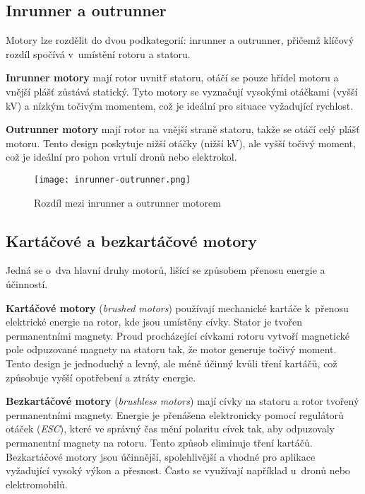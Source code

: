 \documentclass[12pt]{report}
\begin{document}
\subsection[Inrunner a outrunner]{Inrunner a outrunner}
Motory lze rozdělit do dvou podkategorií: inrunner a outrunner, přičemž klíčový rozdíl spočívá v~umístění rotoru a statoru.

\textbf{Inrunner motory} mají rotor uvnitř statoru, otáčí se pouze hřídel motoru a vnější plášť zůstává statický. Tyto motory se vyznačují vysokými otáčkami (vyšší kV) a nízkým točivým momentem, což je ideální pro situace vyžadující rychlost.

\textbf{Outrunner motory} mají rotor na vnější straně statoru, takže se otáčí celý plášť motoru. Tento design poskytuje nižší otáčky (nižší kV), ale vyšší točivý moment, což je ideální pro pohon vrtulí dronů nebo elektrokol. 

\begin{figure}[H]
	\centering
	\texttt{[image: inrunner-outrunner.png]}
	\caption{Rozdíl mezi inrunner a outrunner motorem \cite{rozum}}
	\label{fig:inrunner-outrunner.png}
  \end{figure}

\subsection[Kartáčové a bezkartáčové motory]{Kartáčové a bezkartáčové motory}
Jedná se o~dva hlavní druhy motorů, lišící se způsobem přenosu energie a účinností.

\textbf{Kartáčové motory} (\textit{brushed motors}) používají mechanické kartáče k~přenosu elektrické energie na rotor, kde jsou umístěny cívky. Stator je tvořen permanentními magnety. Proud procházející cívkami rotoru vytvoří magnetické pole odpuzované magnety na statoru tak, že motor generuje točivý moment. Tento design je jednoduchý a levný, ale méně účinný kvůli tření kartáčů, což způsobuje vyšší opotřebení a ztráty energie.

\textbf{Bezkartáčové motory} (\textit{brushless motors}) mají cívky na statoru a rotor tvořený permanentními magnety. Energie je přenášena elektronicky pomocí regulátorů otáček (\textit{ESC}), které ve správný čas mění polaritu cívek tak, aby odpuzovaly permanentní magnety na rotoru. Tento způsob eliminuje tření kartáčů. Bezkartáčové motory jsou účinnější, spolehlivější a vhodné pro aplikace vyžadující vysoký výkon a přesnost. Často se využívají například u~dronů nebo elektromobilů.
\end{document}
